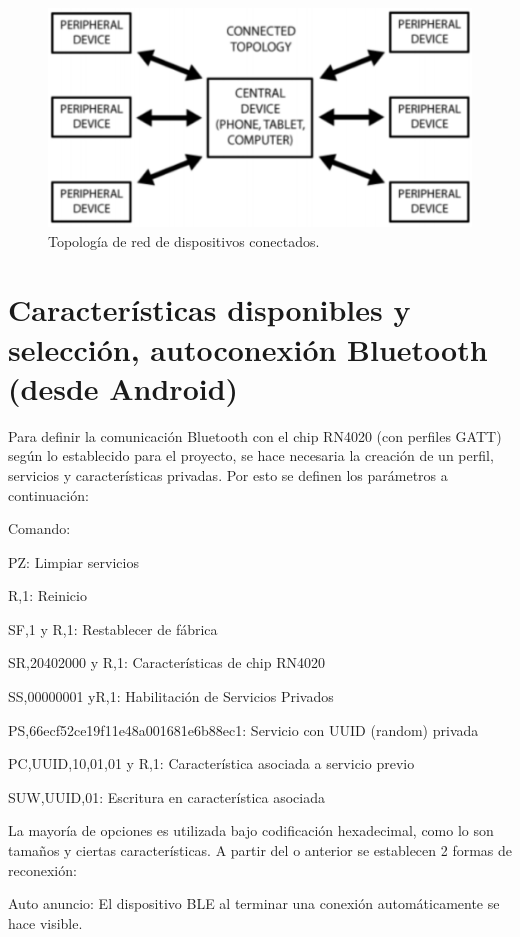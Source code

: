 \begin{figure}[H]
	\centering
	\includegraphics[scale=0.4]{figuras/rn4020/topologia.png}
	\caption{ Topología de red de dispositivos conectados.}
	\label{topologia}
\end{figure}

\newpage

\section{Características disponibles y selección, autoconexión Bluetooth (desde Android)}

Para definir la comunicación Bluetooth con el chip RN4020 (con perfiles GATT) según lo establecido para el proyecto, se hace necesaria la creación de un perfil, servicios y características privadas. Por esto se definen los parámetros a continuación:

Comando: 

	PZ: Limpiar servicios
	
	R,1: Reinicio

	SF,1 y R,1: Restablecer de fábrica

	SR,20402000 y R,1: Características de chip RN4020

	SS,00000001 yR,1: Habilitación de Servicios Privados

	PS,66ecf52ce19f11e48a001681e6b88ec1: Servicio con UUID (random) privada

	PC,UUID,10,01,01 y R,1: Característica asociada a servicio previo

	SUW,UUID,01: Escritura en característica asociada

La mayoría de opciones es utilizada bajo codificación hexadecimal, como lo son tamaños y ciertas características. A partir del o anterior se establecen 2 formas de reconexión: 

	Auto anuncio: El dispositivo BLE al terminar una conexión automáticamente se hace visible.

